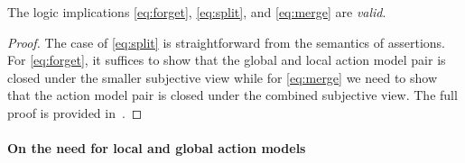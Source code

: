 \begin{lemma}\label{lem:semprinciples}
The logic implications \eqref{eq:forget}, \eqref{eq:split}, and \eqref{eq:merge} are \emph{valid}.
%
\begin{proof}
The case of \eqref{eq:split} is straightforward from the semantics of assertions.
For \eqref{eq:forget}, it suffices to show that the global and local action model pair is closed under the smaller subjective view while for \eqref{eq:merge} we need to show that the action model pair is closed under the combined subjective view. The full proof is provided in~\cite{colosl-tr14}.
\renewcommand{\qed}{}
%
\end{proof}
%
\end{lemma}



\paragraph{On the need for local and global action models}
\label{subsec:localGlobalActionModels}

